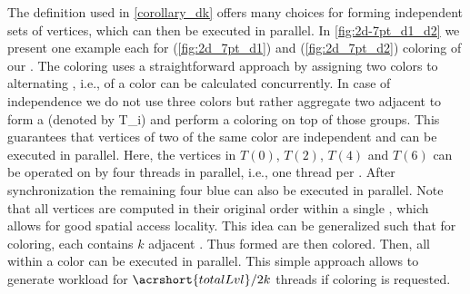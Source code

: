  
The definition used in \cref{corollary_dk} offers many choices for
forming \DK independent sets of vertices, which can then be executed
in parallel.  In \cref{fig:2d-7pt_d1_d2} we present one example each
for \DONE (\cref{fig:2d_7pt_d1}) and \DTWO (\cref{fig:2d_7pt_d2})
coloring of our \stex. The \DONE coloring uses a straightforward
approach by assigning two colors to alternating \levels, i.e., \levels
of a color can be calculated concurrently. In case of \DTWO
independence we do not use three colors but rather aggregate two
adjacent \levels to form a \textit{\levelGroup} (denoted by
\acrshort{T_i}) and perform a \DONE coloring on top of those
groups. This guarantees that vertices of two \levelGroups of the same
color are \DTWO independent and can be executed in parallel. Here, the
vertices in $T(0)$, $T(2)$, $T(4)$ and $T(6)$ can be operated on by
four threads in parallel, i.e., one thread per \levelGroup.  After
synchronization the remaining four blue \levelGroups can also be
executed in parallel. Note that all vertices are computed in their
original order within a single \levelGroup, which allows for good
spatial access locality. This idea can be generalized such that for \DK
coloring, each \levelGroup contains $k$ adjacent \levels.
Thus formed \levelGroups are then \DONE
colored. Then, all \levelGroups within a color can be executed in
parallel. This simple approach allows to generate workload for
${\acrshort{totalLvl}}/{2 k}$ threads if \DK coloring is
requested.
 
